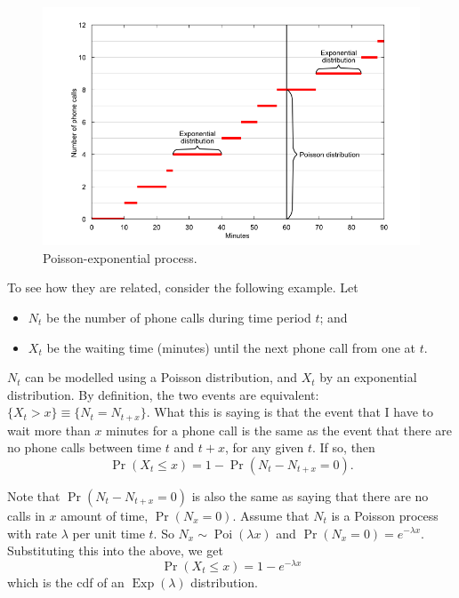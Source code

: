 \documentclass[
]{book}
\providecommand{\tightlist}{%
  \setlength{\itemsep}{0pt}\setlength{\parskip}{0pt}}
\DeclareMathOperator{\Pois}{Poi}
\DeclareMathOperator{\Exp}{Exp}
\theoremstyle{definition}
\theoremstyle{definition}
\theoremstyle{definition}
\theoremstyle{definition}
\theoremstyle{remark}
\begin{document}
\begin{figure}

{\centering \includegraphics[width=0.9\linewidth]{figure/exp_poisson_process} 

}

\caption{Poisson-exponential process.}\label{fig:exppoissonprocess}
\end{figure}

To see how they are related, consider the following example.
Let

\begin{itemize}
\tightlist
\item
  \(N_t\) be the number of phone calls during time period \(t\); and
\item
  \(X_t\) be the waiting time (minutes) until the next phone call from one at \(t\).
\end{itemize}

\(N_t\) can be modelled using a Poisson distribution, and \(X_t\) by an exponential distribution.
By definition, the two events are equivalent: \(\{X_t > x \} \equiv \{N_t = N_{t+x}\}\).
What this is saying is that the event that I have to wait more than \(x\) minutes for a phone call is the same as the event that there are no phone calls between time \(t\) and \(t+x\), for any given \(t\).
If so, then \[\Pr(X_t \leq x) = 1 - \Pr(N_t - N_{t+x}=0).\]

Note that \(\Pr(N_t - N_{t+x}=0)\) is also the same as saying that there are no calls in \(x\) amount of time, \(\Pr(N_x=0)\).
Assume that \(N_t\) is a Poisson process with rate \(\lambda\) per unit time \(t\).
So \(N_x \sim \Pois(\lambda x)\) and \(\Pr(N_x=0) = e^{-\lambda x}\).
Substituting this into the above, we get
\[
  \Pr(X_t \leq x) = 1 - e^{-\lambda x}
\]
which is the cdf of an \(\Exp(\lambda)\) distribution.
\end{document}
